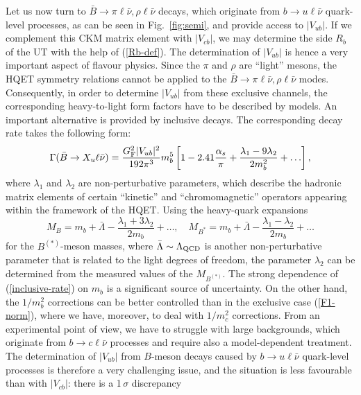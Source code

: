 \documentclass[11pt]{cernrep}
\begin{document}
Let us now turn to $\bar B\to \pi\ell\bar\nu, \rho\ell\bar\nu$ decays, 
which originate from $b\to u\ell \bar\nu$ quark-level processes, as
can be seen in Fig.~\ref{fig:semi}, and provide access to $|V_{ub}|$. 
If we complement this CKM matrix element with $|V_{cb}|$, we may determine 
the side $R_b$ of the UT with the help of (\ref{Rb-def}). The 
determination of $|V_{ub}|$ is hence a very important aspect of
flavour physics. Since the $\pi$ and $\rho$ are ``light'' mesons, 
the HQET symmetry relations 
cannot be applied to the $\bar B\to \pi\ell\bar\nu, \rho\ell\bar\nu$ modes. 
Consequently, in order to determine $|V_{ub}|$ from these exclusive 
channels, the corresponding heavy-to-light form factors have to be
described by models. An important alternative is provided by inclusive 
decays. The corresponding decay rate takes the following form:
\begin{equation}\label{inclusive-rate}
\Gamma(\bar B\to X_u \ell \bar \nu)=
\frac{G_{\rm F}^2|V_{ub}|^2}{192\pi^3}m_b^5
\left[1-2.41\frac{\alpha_s}{\pi}+\frac{\lambda_1-9\lambda_2}{2m_b^2}
+\ldots\right],
\end{equation}
where $\lambda_1$ and $\lambda_2$ are non-perturbative parameters, 
which describe the hadronic matrix elements of certain ``kinetic'' 
and ``chromomagnetic'' operators appearing within the framework of
the HQET. Using the heavy-quark expansions
\begin{equation}\label{mass-exp}
M_B=m_b+\bar\Lambda-\frac{\lambda_1+3\lambda_2}{2m_b}+\ldots, \quad
M_{B^\ast}=m_b+\bar\Lambda-\frac{\lambda_1-\lambda_2}{2m_b}+\ldots
\end{equation}
for the $B^{(\ast)}$-meson masses, where $\bar\Lambda\sim\Lambda_{\rm QCD}$ 
is another non-perturbative parameter that is related to the light degrees
of freedom, the parameter $\lambda_2$ can be determined from the measured
values of the $M_{B^{(\ast)}}$. The strong dependence of 
(\ref{inclusive-rate}) on $m_b$ is a significant
source of uncertainty. On the other hand, the $1/m_b^2$ corrections
can be better controlled than in the exclusive case (\ref{F1-norm}), 
where we have, moreover, to deal with $1/m_c^2$ corrections. From an 
experimental point of view, we have to struggle with large backgrounds, 
which originate from $b\to c \ell \bar\nu$ processes and require also 
a model-dependent treatment. The determination of $|V_{ub}|$ from 
$B$-meson decays caused by $b\to u\ell \bar\nu$ 
quark-level processes is therefore a very challenging issue, and the situation 
is less favourable than with $|V_{cb}|$: there is a 1$\,\sigma$ discrepancy 
\end{document}
